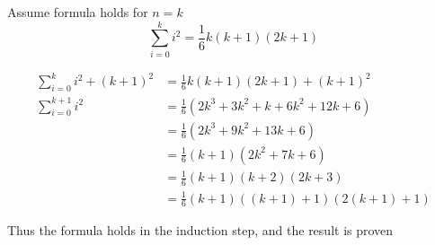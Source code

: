 \documentclass{article}
\begin{document}
Assume formula holds for \(n = k\)
\[
\sum_{i=0}^{k} i^2 = \frac{1}{6}k(k+1)(2k+1)
\]


\begin{align*}
    \sum_{i=0}^{k} i^2 + (k+1)^2 &= \frac{1}{6}k(k+1)(2k+1) + (k+1)^2 \\
    \sum_{i=0}^{k+1} i^2 &= \frac{1}{6}(2k^3 + 3k^2 + k  + 6k^2 + 12k + 6 ) \\ 
    &= \frac{1}{6}(2k^3 + 9k^2 + 13k + 6 ) \\ 
    &= \frac{1}{6}(k+1)(2k^2 + 7k + 6) \\ 
    & = \frac{1}{6}(k+1)(k+2)(2k + 3) \\
    & = \frac{1}{6}(k+1)((k+1)+1)(2(k+1)+1)
\end{align*}

Thus the formula holds in the induction step, and the result is proven
\end{document}
